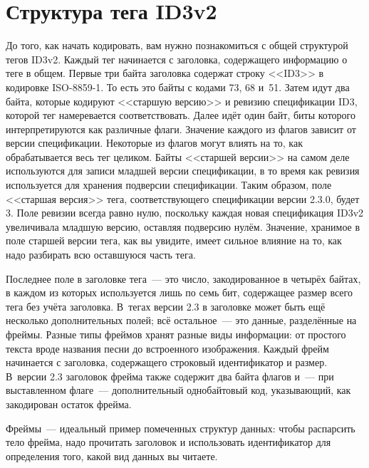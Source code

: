 \section{Структура тега ID3v2}

До того, как начать кодировать, вам нужно познакомиться с общей структурой тегов
ID3v2. Каждый тег начинается с заголовка, содержащего информацию о теге в общем. Первые
три байта заголовка содержат строку <<ID3>> в кодировке ISO-8859-1. То есть это байты с
кодами 73, 68 и~51. Затем идут два байта, которые кодируют <<старшую версию>> и ревизию
спецификации ID3, которой тег намеревается соответствовать. Далее идёт один байт, биты
которого интерпретируются как различные флаги. Значение каждого из флагов зависит от
версии спецификации. Некоторые из флагов могут влиять на то, как обрабатывается весь тег
целиком.  Байты <<старшей версии>> на самом деле используются для записи младшей версии
спецификации, в то время как ревизия используется для хранения подверсии
спецификации. Таким образом, поле <<старшая версия>> тега, соответствующего спецификации
версии 2.3.0, будет 3. Поле ревизии всег\-да равно нулю, поскольку каждая новая спецификация
ID3v2 увеличивала младшую версию, оставляя подверсию нулём. Значение, хранимое в поле
старшей версии тега, как вы увидите, имеет сильное влияние на то, как надо разбирать всю
оставшуюся часть тега.

Последнее поле в заголовке тега~--- это число, закодированное в четырёх байтах, в каждом из
которых используется лишь по семь бит, содержащее размер всего тега без учёта заголовка.
В~тегах версии 2.3 в заголовке может быть ещё несколько дополнительных полей; всё
остальное~--- это данные, разделённые на фреймы.  Разные типы фреймов хранят разные виды
информации: от простого текста вроде названия песни до встроенного изображения.  Каждый
фрейм начинается с заголовка, содержащего строковый идентификатор и размер. В~версии 2.3
заголовок фрейма также содержит два байта флагов и~--- при выставленном флаге~---
дополнительный однобайтовый код, указывающий, как закодирован остаток фрейма.

Фреймы~--- идеальный пример помеченных структур данных: чтобы распарсить тело
фрейма, надо прочитать заголовок и использовать идентификатор для определения того, какой вид
данных вы читаете.

